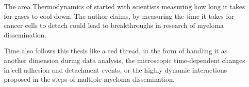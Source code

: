 

%
\label{sec:discussion_overall_conclusion}%

The area Thermodynamics of started with scientists measuring how long it takes
for gases to cool down. The author claims, by measuring the time it takes for
cancer cells to detach could lead to breakthroughs in research of myeloma
dissemination.

Time also follows this thesis like a red thread, in the form of handling it
as another dimension during data analysis, the microscopic time-dependent
changes in cell adhesion and detachment events, or the highly dynamic
interactions proposed in the steps of multiple myeloma dissemination. 